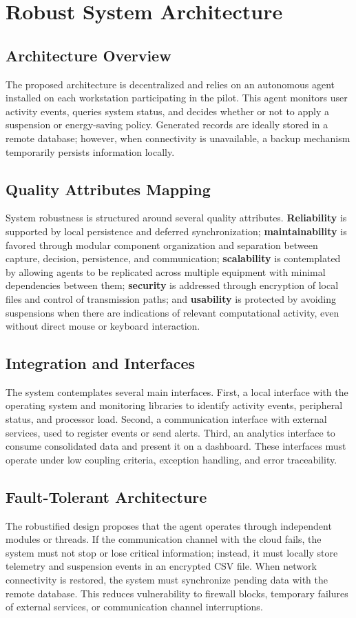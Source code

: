\documentclass[12pt,a4paper]{article}
\begin{document}
\section{Robust System Architecture}

\subsection{Architecture Overview}
The proposed architecture is decentralized and relies on an autonomous agent installed on each workstation participating in the pilot. This agent monitors user activity events, queries system status, and decides whether or not to apply a suspension or energy-saving policy. Generated records are ideally stored in a remote database; however, when connectivity is unavailable, a backup mechanism temporarily persists information locally.

\subsection{Quality Attributes Mapping}
System robustness is structured around several quality attributes. \textbf{Reliability} is supported by local persistence and deferred synchronization; \textbf{maintainability} is favored through modular component organization and separation between capture, decision, persistence, and communication; \textbf{scalability} is contemplated by allowing agents to be replicated across multiple equipment with minimal dependencies between them; \textbf{security} is addressed through encryption of local files and control of transmission paths; and \textbf{usability} is protected by avoiding suspensions when there are indications of relevant computational activity, even without direct mouse or keyboard interaction.

\subsection{Integration and Interfaces}
The system contemplates several main interfaces. First, a local interface with the operating system and monitoring libraries to identify activity events, peripheral status, and processor load. Second, a communication interface with external services, used to register events or send alerts. Third, an analytics interface to consume consolidated data and present it on a dashboard. These interfaces must operate under low coupling criteria, exception handling, and error traceability.

\subsection{Fault-Tolerant Architecture}
The robustified design proposes that the agent operates through independent modules or threads. If the communication channel with the cloud fails, the system must not stop or lose critical information; instead, it must locally store telemetry and suspension events in an encrypted CSV file. When network connectivity is restored, the system must synchronize pending data with the remote database. This reduces vulnerability to firewall blocks, temporary failures of external services, or communication channel interruptions.
\end{document}
